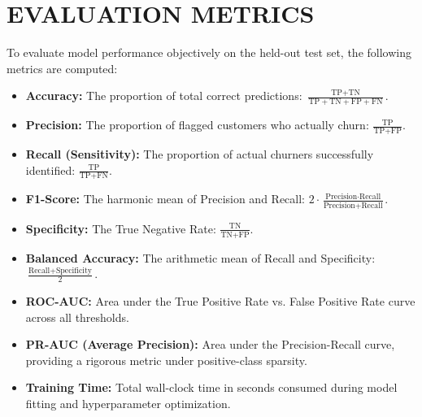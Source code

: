 \section{EVALUATION METRICS}
To evaluate model performance objectively on the held-out test set, the following metrics are computed:
\begin{itemize}
    \item \textbf{Accuracy:} The proportion of total correct predictions: $\frac{\text{TP} + \text{TN}}{\text{TP} + \text{TN} + \text{FP} + \text{FN}}$.
    \item \textbf{Precision:} The proportion of flagged customers who actually churn: $\frac{\text{TP}}{\text{TP} + \text{FP}}$.
    \item \textbf{Recall (Sensitivity):} The proportion of actual churners successfully identified: $\frac{\text{TP}}{\text{TP} + \text{FN}}$.
    \item \textbf{F1-Score:} The harmonic mean of Precision and Recall: $2 \cdot \frac{\text{Precision} \cdot \text{Recall}}{\text{Precision} + \text{Recall}}$.
    \item \textbf{Specificity:} The True Negative Rate: $\frac{\text{TN}}{\text{TN} + \text{FP}}$.
    \item \textbf{Balanced Accuracy:} The arithmetic mean of Recall and Specificity: $\frac{\text{Recall} + \text{Specificity}}{2}$.
    \item \textbf{ROC-AUC:} Area under the True Positive Rate vs. False Positive Rate curve across all thresholds.
    \item \textbf{PR-AUC (Average Precision):} Area under the Precision-Recall curve, providing a rigorous metric under positive-class sparsity.
    \item \textbf{Training Time:} Total wall-clock time in seconds consumed during model fitting and hyperparameter optimization.
\end{itemize}


